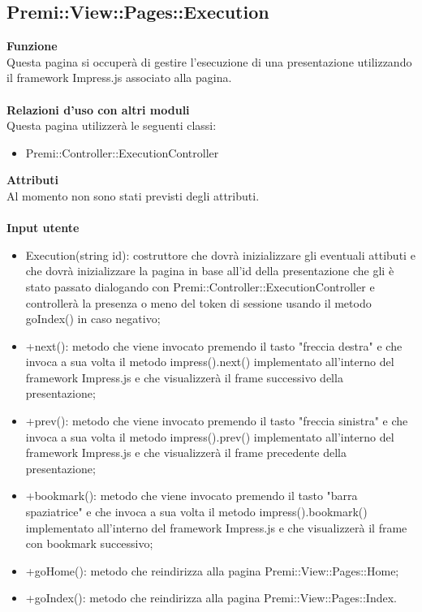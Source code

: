 {					\subsection{Premi::View::Pages::Execution}{
						\textbf{Funzione}\\
						\indent Questa pagina si occuperà di gestire l'esecuzione di una presentazione utilizzando il framework Impress.js associato alla pagina.\\\\
						\textbf{Relazioni d'uso con altri moduli}\\
						\indent Questa pagina utilizzerà le seguenti classi:
						\begin{itemize}
							\item Premi::Controller::ExecutionController
						\end{itemize}
						\textbf{Attributi}\\
						\indent Al momento non sono stati previsti degli attributi.\\\\
						\textbf{Input utente}
						\begin{itemize}
							\item Execution(string id): costruttore che dovrà inizializzare gli eventuali attibuti e che dovrà inizializzare la pagina in base all'id della presentazione che gli è stato passato dialogando con Premi::Controller::ExecutionController e controllerà la presenza o meno del token di sessione usando il metodo goIndex() in caso negativo;
							\item +next(): metodo che viene invocato premendo il tasto "freccia destra" e che invoca a sua volta il metodo impress().next() implementato all'interno del framework Impress.js e che visualizzerà il frame successivo della presentazione;
							\item +prev(): metodo che viene invocato premendo il tasto "freccia sinistra" e che invoca a sua volta il metodo impress().prev() implementato all'interno del framework Impress.js e che visualizzerà il frame precedente della presentazione;
							\item +bookmark(): metodo che viene invocato premendo il tasto "barra spaziatrice" e che invoca a sua volta il metodo impress().bookmark() implementato all'interno del framework Impress.js e che visualizzerà il frame con bookmark successivo;
							\item +goHome(): metodo che reindirizza alla pagina Premi::View::Pages::Home;
							\item +goIndex(): metodo che reindirizza alla pagina Premi::View::Pages::Index.
						\end{itemize}
					}
}
